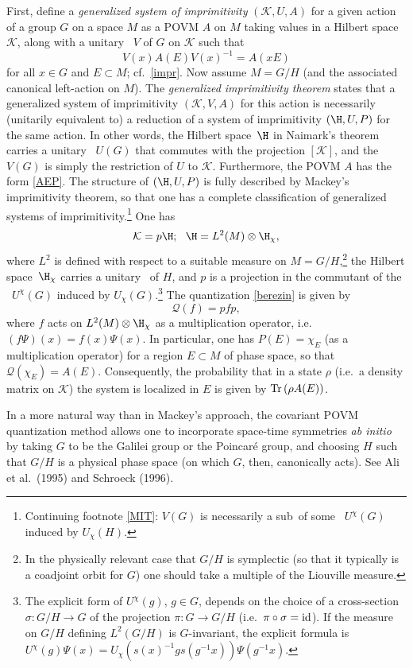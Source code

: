 \documentclass[12pt,titlepage]{article}
\newcommand{\beq}{\begin{equation}}
\newcommand{\eeq}{\end{equation}}
\newcommand{\Hs}{Hilbert space} \newcommand{\Bs}{Banach space}
\newcommand{\id}{\mbox{\rm id}}
\newcommand{\raw}{\rightarrow} \newcommand{\rat}{\mapsto}
\newcommand{\ot}{\otimes}
\newcommand{\Tr}{\mbox{\rm Tr}\,} \newcommand{\Ad}{{\rm Ad}}
\newcommand{\inv}{^{-1}} \newcommand{\sa}{_{\R}}
\newcommand{\er}{\eqref}
\newcommand{\rh}{\rho} \newcommand{\sg}{\sigma}
\newcommand{\ch}{\chi} \newcommand{\ps}{\psi} \newcommand{\Ps}{\Psi}
\newcommand{\CK}{{\mathcal K}}   \newcommand{\CL}{{\mathcal L}}
\newcommand{\CQ}{{\mathcal Q}} \newcommand{\CR}{{\mathcal R}}
\begin{document}
First, define a {\it generalized system of imprimitivity} $(\CK,U,A)$ for
a given action of a group $G$  on a space $M$ as a POVM $A$ on $M$ taking values in a \Hs\ $\CK$, along with  a unitary \rep\ $V$ of $G$ on $\CK$ such that
\beq V(x)A(E)V(x)\inv=A(xE) \label{gimpr}\eeq
for all $x\in G$ and $E\subset M$; cf.\ \er{impr}. Now assume  $M=G/H$ (and the associated canonical left-action on $M$). The {\it generalized imprimitivity theorem} states that a generalized system of imprimitivity $(\CK,V,A)$ for this action is necessarily (unitarily equivalent to) a reduction of a system of imprimitivity $(\H, U,P)$ for the same action. In other words, the \Hs\ $\H$  in Naimark's theorem carries a unitary \rep\ $U(G)$ that commutes with the projection $[\CK]$, and the \rep\ $V(G)$ is simply the restriction of $U$ to $\CK$. Furthermore, the POVM $A$ has the form \er{AEP}. The structure of $(\H, U,P)$ is fully described by Mackey's imprimitivity theorem, so that one has a complete classification of generalized  systems of imprimitivity.\footnote{Continuing footnote  \ref{MIT}: $V(G)$ is necessarily a sub\rep\ of some \rep\ $U^{\ch}(G)$ induced by $U_{\ch}(H)$.} One has
\beq \CK=p\H; \:\:\: \H= L^2(M)\ot\H_{\ch}, \label{pH}\eeq
where $L^2$ is defined with respect to a suitable measure on $M=G/H$,\footnote{In the physically relevant case  that $G/H$ is symplectic 
(so that it typically is a coadjoint orbit for $G$) one should take a multiple of the Liouville measure.} the \Hs\ 
$\H_{\ch}$ carries a unitary \rep\ of $H$, and $p$ is a projection in the commutant
of the \rep\ $U^{\ch}(G)$ induced by $U_{\ch}(G)$.\footnote{The explicit form of $U^{\ch}(g)$, $g\in G$, depends on the choice of a cross-section $\sg:G/H\raw G$ of the projection $\pi: G\raw G/H$ (i.e.\ $\pi\circ\sg=\id$). If the measure on $G/H$ defining $L^2(G/H)$ is $G$-invariant, the explicit formula is $U^{\ch}(g)\Psi(x)=U_{\ch}(s(x)\inv g s(g\inv x))\Psi(g\inv x)$.} The quantization \er{berezin} is given by
\beq \CQ(f)=pfp, \label{PSQE}\eeq
where $f$ acts on $L^2(M)\ot\H_{\ch}$ as a multiplication operator, i.e.\ $(f\Psi)(x)=f(x)\Psi(x)$. In particular, one has $P(E)=\ch_E$ (as a multiplication operator) for
 a region $E\subset M$ of phase space, so that $\CQ(\ch_E)=A(E)$. Consequently, the probability that in a state $\rh$ (i.e.\ a density matrix on $\CK$) the system is localized in $E$ is given by  $\Tr (\rh A(E))$. 

In a more natural way than in  Mackey's approach, the covariant POVM quantization method allows one to incorporate space-time symmetries {\it ab initio}  by taking $G$ to be 
 the Galilei group or the Poincar\'{e} group, and choosing $H$ such that $G/H$ is a physical phase space (on which $G$, then, canonically acts).
 See  Ali et al.\ (1995) and  Schroeck (1996).
 
\end{document}
